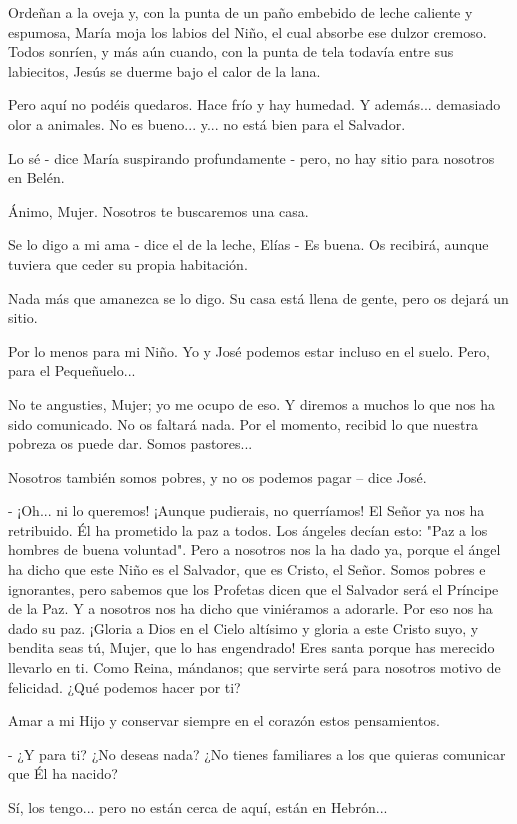 \documentclass[12pt, twoside, openright]{book} %
\begin{document}
Ordeñan a la oveja y, con la punta de un paño embebido de leche caliente y espumosa, María moja los labios del Niño, el cual absorbe ese dulzor cremoso. Todos sonríen, y más aún cuando, con la punta de tela todavía entre sus labiecitos, Jesús se duerme bajo el calor de la lana. 

Pero aquí no podéis quedaros. Hace frío y hay humedad. Y además... demasiado olor a animales. No es bueno... y... no está bien para el Salvador. 

Lo sé - dice María suspirando profundamente - pero, no hay sitio para nosotros en Belén. 

Ánimo, Mujer. Nosotros te buscaremos una casa. 

Se lo digo a mi ama - dice el de la leche, Elías - Es buena. Os recibirá, aunque tuviera que ceder su propia habitación. 

Nada más que amanezca se lo digo. Su casa está llena de gente, pero os dejará un sitio. 

Por lo menos para mi Niño. Yo y José podemos estar incluso en el suelo. Pero, para el Pequeñuelo... 

No te angusties, Mujer; yo me ocupo de eso. Y diremos a muchos lo que nos ha sido comunicado. No os faltará nada. Por el momento, recibid lo que nuestra pobreza os puede dar. Somos pastores... 

Nosotros también somos pobres, y no os podemos pagar – dice José. 

- ¡Oh... ni lo queremos! ¡Aunque pudierais, no querríamos! El Señor ya nos ha retribuido. Él ha prometido la paz a todos. Los ángeles decían esto: "Paz a los hombres de buena voluntad". Pero a nosotros nos la ha dado ya, porque el ángel ha dicho que este Niño es el Salvador, que es Cristo, el Señor. Somos pobres e ignorantes, pero sabemos que los Profetas dicen que el Salvador será el Príncipe de la Paz. Y a nosotros nos ha dicho que viniéramos a adorarle. Por eso nos ha dado su paz. ¡Gloria a Dios en el Cielo altísimo y gloria a este Cristo suyo, y bendita seas tú, Mujer, que lo has engendrado! Eres santa porque has merecido llevarlo en ti. Como Reina, mándanos; que servirte será para nosotros motivo de felicidad. ¿Qué podemos hacer por ti? 

Amar a mi Hijo y conservar siempre en el corazón estos pensamientos. 

- ¿Y para ti? ¿No deseas nada? ¿No tienes familiares a los que quieras comunicar que Él ha nacido? 

Sí, los tengo... pero no están cerca de aquí, están en Hebrón... 
\end{document}
